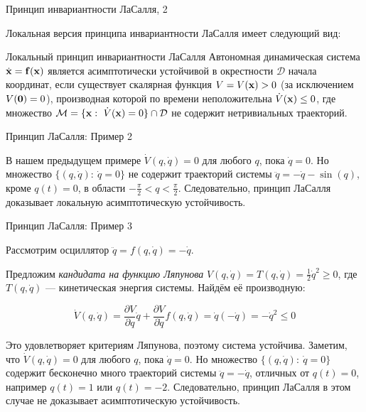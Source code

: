 \documentclass{beamer}
\begin{document}
\begin{frame}{Принцип инвариантности ЛаСалля, 2}
	\begin{flushleft}
		
		Локальная версия принципа инвариантности ЛаСалля имеет следующий вид:
		
		\begin{block}{Локальный принцип инвариантности ЛаСалля}
			Автономная динамическая система $\dot{\mathbf{x}} = \mathbf{f}(\mathbf{x})$ является асимптотически устойчивой в окрестности $\mathcal D$ начала координат, если существует скалярная функция $V = V(\mathbf{x}) > 0$ (за исключением $V(\mathbf{0}) = 0$), производная которой по времени неположительна $\dot V(\mathbf{x}) \leq 0$, где множество $\mathcal M = \{\mathbf{x}: \   \dot V(\mathbf{x}) = 0  \} \cap \mathcal D$ не содержит нетривиальных траекторий.
		\end{block}
		
	\end{flushleft}
\end{frame}

\begin{frame}{Принцип ЛаСалля: Пример 2}
	\begin{flushleft}
		
		В нашем предыдущем примере $\dot V(q, \dot{q}) = 0$ для любого $q$, пока $\dot{q} = 0$. Но множество $\{(q, \dot{q}): \   \dot{q} = 0 \}$ не содержит траекторий системы $\ddot{q}  = -\dot{q} - \sin(q)$, кроме $q(t) = 0$, в области $-\frac{\pi}{2} < q < \frac{\pi}{2}$. Следовательно, принцип ЛаСалля доказывает локальную асимптотическую устойчивость.
		
	\end{flushleft}
\end{frame}

\begin{frame}{Принцип ЛаСалля: Пример 3}
	\begin{flushleft}
		
		Рассмотрим осциллятор $\ddot{q} = f(q, \dot{q}) = -\dot{q}$. 
		
		\bigskip
		
		Предложим \emph{кандидата на функцию Ляпунова} $V(q, \dot{q}) = T(q, \dot{q}) = \frac{1}{2} \dot{q}^2 \geq 0$, где $T(q, \dot{q})$ — кинетическая энергия системы. Найдём её производную:
		
		\begin{equation}
			\dot V(q, \dot{q}) = 
			\frac{\partial V}{\partial q}       \dot{q} +
			\frac{\partial V}{\partial \dot{q}} f(q, \dot{q}) = 
			\dot{q} (-\dot{q}) = -\dot{q}^2 \leq 0
		\end{equation}
		
		Это удовлетворяет критериям Ляпунова, поэтому система устойчива. Заметим, что $\dot V(q, \dot{q}) = 0$ для любого $q$, пока $\dot{q} = 0$. Но множество $\{(q, \dot{q}): \   \dot{q} = 0 \}$ содержит бесконечно много траекторий системы $\ddot{q} = -\dot{q}$, отличных от $q(t) = 0$, например $q(t) = 1$ или $q(t) = -2$. Следовательно, принцип ЛаСалля в этом случае не доказывает асимптотическую устойчивость.
		
	\end{flushleft}
\end{frame}
\end{document}
